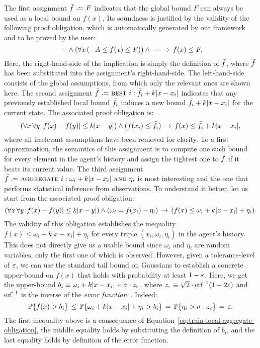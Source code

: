 \documentclass[acmsmall,screen,nonacm]{acmart}
\begin{document}
The first assignment $\TrainFxMax \slassign F$ indicates that the global bound $F$ can always be used as a local bound on $f(x)$. Its soundness is justified by the validity of the following proof obligation, which is automatically generated by our framework and to be proved by the user: \[\cdots \land(\forall x \,  (-A \le f(x) \le F)) \land \cdots \,\rightarrow\, f(x) \le F.\] Here, the right-hand-side of the implication is simply the definition of $\bar {f}$, where $\bar {f}$ has been substituted into the assignment's right-hand-side. The left-hand-side consists of the global assumptions, from which only the relevant ones are shown here. The second assignment $\TrainFxMax \slassign \slbest i: \TrainFxMax_i + k|x - x_i|$ indicates that any previously established local bound $\bar {f}_i$ induces a new bound $\bar {f}_i + k|x-x_i|$ for the current state. The associated proof obligation is: \[  (\forall x \, \forall y \, |f(x) - f(y)| \le k |x - y|) \land (f(x_i) \le \bar {f}_i) \,\rightarrow\, f(x) \le \bar {f}_i + k|x - x_i|, \] where all irrelevant assumptions have been removed for clarity. To a first approximation, the semantics of this assignment is to compute one such bound for every element in the agent's history and assign the tightest one to $\bar {f}$ if it beats its current value. The third assignment $\TrainFxMax \slassign \slaggregate i: \omega_i + k|x - x_i| \sland \eta_i$ is most interesting and the one that performs statistical inference from observations. To understand it better, let us start from the associated proof obligation:
\begin{equation}\label{eq:train-local-aggregate-obligation}
(\forall x \, \forall y \, |f(x) - f(y)| \le k |x - y|) \land (\omega_i = f(x_i) - \eta_i) \,\rightarrow\, (f(x) \le \omega_i + k|x-x_i| + \eta_i).
\end{equation}
The validity of this obligation establishes the inequality $f(x) \le \omega_i + k|x-x_i| + \eta_i$ for every triple $(x_i, \omega_i, \eta_i)$ in the agent's history. This does not directly give us a usable bound since $\omega_i$ and $\eta_i$ are random variables, only the first one of which is observed. However, given a tolerance-level of $\varepsilon$, we can use the standard tail bound on Gaussians to establish a concrete upper-bound on $f(x)$ that holds with probability at least $1 - \varepsilon$. Here, we get the upper-bound $b_i \equiv \omega_i + k|x-x_i| + \sigma \cdot z_\varepsilon$, where  $z_\varepsilon \equiv \sqrt{2} \cdot \operatorname{\text{erf}^{\,-1}}(1 - 2\varepsilon)$ and $\operatorname{\text{erf}^{\,-1}}$ is the inverse of the \emph{error function}~\cite{bertsekas2008introduction}. Indeed:
\[ \mathbb{P}\{f(x) > b_i \} \,\le\, \mathbb{P}\{ \omega_i + k|x-x_i| + \eta_i > b_i \} \,=\, \mathbb{P} \{ \eta_i > \sigma \cdot z_\varepsilon \} \,=\, \varepsilon. \]
The first inequality above is a consequence of Equation~\ref{eq:train-local-aggregate-obligation}, the middle equality holds by substituting the definition of $b_i$, and the last equality holds by definition of the error function.
\end{document}
